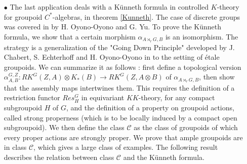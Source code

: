 \begin{itemize}
\item[$\bullet$] The last application deals with a Künneth formula in controlled $K$-theory for groupoid $C^*$-algebras, in theorem \ref{Kunneth}. The case of discrete groups was covered in \cite{OY4} by H. Oyono-Oyono and G. Yu. To prove the Künneth formula, we show that a certain morphism $\alpha_{A\rtimes_r G,B}$ is an isomorphism. The strategy is a generalization of the "Going Down Principle" developed by J. Chabert, S. Echterhoff and H. Oyono-Oyono in \cite{ChabertEOY} to the setting of étale groupoids. We can summarize it as follows : first define a topological version $\alpha_{A,B}^{G,Z} : RK^G(Z,A)\otimes K_*(B)\rightarrow RK^G(Z,A\otimes B )$ of $\alpha_{A\rtimes_r G,B}$, then show that the assembly maps intertwines them. This requires the definition of a restriction functor $Res_H^G$ in equivariant $KK$-theory, for any compact subgroupoid $H$ of $G$, and the definition of a property on groupoid actions, called strong properness (which is to be locally induced by a compact open subgroupoid). We then define the class $\mathcal C$ as the class of groupoids of which every proper actions are strongly proper. We prove that ample groupoids are in class $\mathcal C$, which gives a large class of examples. The following result describes the relation between class $\mathcal C$ and the Künneth formula. \\



\end{itemize}
